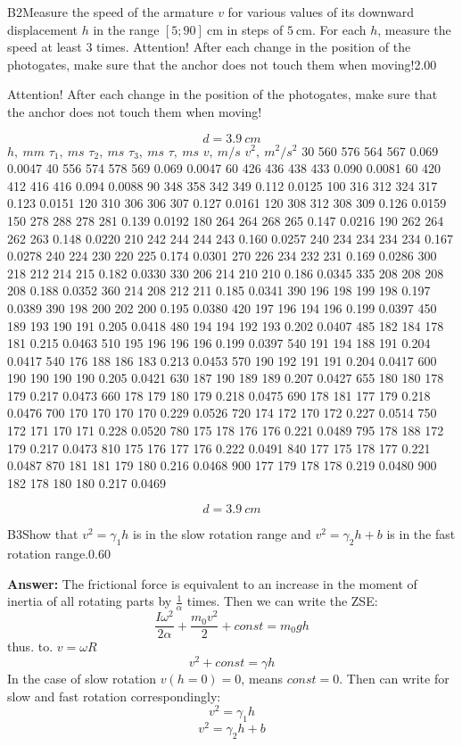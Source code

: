 \documentclass[11pt,a4paper]{article}
\begin{document}
\begin{solcard}{B2}{Measure the speed of the armature $v$ for various values of its downward displacement $h$ in the range $[5; 90] ~ \text{cm}$ in steps of $5 ~ \text{cm}$. For each $h$, measure the speed at least 3 times. Attention! After each change in the position of the photogates, make sure that the anchor does not touch them when moving!}{2.00}

Attention! After each change in the position of the photogates, make sure that the anchor does not touch them when moving!


$$d = 3.9~cm$$ $h,~mm$ $\tau_1,~ms$ $\tau_2,~ms$ $\tau_3,~ms$ $\tau,~ms$ $v,~m/s$ $v^2,~m^2/s^2$ 30 560 576 564 567 0.069 0.0047 40 556 574 578 569 0.069 0.0047 60 426 436 438 433 0.090 0.0081 60 420 412 416 416 0.094 0.0088 90 348 358 342 349 0.112 0.0125 100 316 312 324 317 0.123 0.0151 120 310 306 306 307 0.127 0.0161 120 308 312 308 309 0.126 0.0159 150 278 288 278 281 0.139 0.0192 180 264 264 268 265 0.147 0.0216 190 262 264 262 263 0.148 0.0220 210 242 244 244 243 0.160 0.0257 240 234 234 234 234 0.167 0.0278 240 224 230 220 225 0.174 0.0301 270 226 234 232 231 0.169 0.0286 300 218 212 214 215 0.182 0.0330 330 206 214 210 210 0.186 0.0345 335 208 208 208 208 0.188 0.0352 360 214 208 212 211 0.185 0.0341 390 196 198 199 198 0.197 0.0389 390 198 200 202 200 0.195 0.0380 420 197 196 194 196 0.199 0.0397 450 189 193 190 191 0.205 0.0418 480 194 194 192 193 0.202 0.0407 485 182 184 178 181 0.215 0.0463 510 195 196 196 196 0.199 0.0397 540 191 194 188 191 0.204 0.0417 540 176 188 186 183 0.213 0.0453 570 190 192 191 191 0.204 0.0417 600 190 190 190 190 0.205 0.0421 630 187 190 189 189 0.207 0.0427 655 180 180 178 179 0.217 0.0473 660 178 179 180 179 0.218 0.0475 690 178 181 177 179 0.218 0.0476 700 170 170 170 170 0.229 0.0526 720 174 172 170 172 0.227 0.0514 750 172 171 170 171 0.228 0.0520 780 175 178 176 176 0.221 0.0489 795 178 188 172 179 0.217 0.0473 810 175 176 177 176 0.222 0.0491 840 177 175 178 177 0.221 0.0487 870 181 181 179 180 0.216 0.0468 900 177 179 178 178 0.219 0.0480 900 182 178 180 180 0.217 0.0469


$$d = 3.9~cm$$

\end{solcard}

\begin{solcard}{B3}{Show that $v^2 = \gamma_1 h$ is in the slow rotation range and $v^2 = \gamma_2 h + b$ is in the fast rotation range.}{0.60}
\par\smallskip\noindent\textbf{Answer:} The frictional force is equivalent to an increase in the moment of inertia of all rotating parts by $\frac{1}{\alpha}$ times. Then we can write the ZSE: $$\frac{I\omega^2}{2\alpha} + \frac{m_0 v^2}{2} + const= m_0gh$$thus. to. $v = \omega R$ $$v^2 + const = \gamma h $$In the case of slow rotation $v(h\! =\! 0) = 0$, means $const = 0$. Then can write for slow and fast rotation correspondingly: $$v^2 = \gamma_1h$$$$v^2 = \gamma_2 h+ b $$
\end{solcard}
\end{document}

